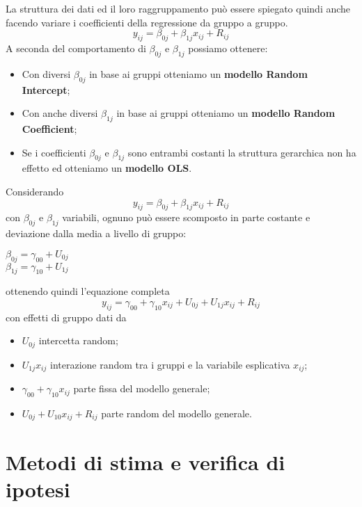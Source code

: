 \documentclass[a4page, 11pt]{article} %
\begin{document}
La struttura dei dati ed il loro raggruppamento può essere spiegato quindi anche facendo variare i coefficienti della regressione da gruppo a gruppo.
\begin{equation*}
y_{ij}=\beta_{0j}+\beta_{1j} x_{ij}+ R_{ij}
\end{equation*}
A seconda del comportamento di $\beta_{0j}$ e $\beta_{1j}$ possiamo ottenere:
\begin{itemize}
\item Con diversi $\beta_{0j}$ in base ai gruppi otteniamo un  \textbf{modello Random Intercept};
\item Con anche diversi $\beta_{1j}$ in base ai gruppi otteniamo un \textbf{modello Random Coefficient};
\item Se i coefficienti $\beta_{0j}$ e $\beta_{1j}$ sono entrambi costanti la struttura gerarchica non ha effetto ed otteniamo un \textbf{modello OLS}.
\end{itemize}
Considerando
\begin{equation*}
y_{ij} = \beta_{0j} + \beta_{1j} x_{ij} +R_{ij}
\end{equation*}
con $\beta_{0j}$ e $\beta_{1j}$ variabili, ognuno può essere scomposto in parte costante e deviazione dalla media a livello di gruppo:
\begin{center}
$\beta_{0j} = \gamma_{00} + U_{0j}$ \\
$\beta_{1j} = \gamma_{10} + U_{1j}$
\end{center}
ottenendo quindi l'equazione completa
\begin{equation*}
y_{ij} = \gamma_{00} + \gamma_{10} x_{ij} + U_{0j} + U_{1j} x_{ij} + R_{ij}
\end{equation*}
con effetti di gruppo dati da
\begin{itemize}
\item $U_{0j}$ intercetta random;
\item $U_{1j} x_{ij}$ interazione random tra i gruppi e la variabile esplicativa $x_{ij}$;
\item $\gamma_{00} + \gamma_{10} x_{ij}$ parte fissa del modello generale;
\item $U_{0j} + U_{10} x_{ij} + R_{ij}$ parte random del modello generale.
\end{itemize}
\section{Metodi di stima e verifica di ipotesi}
\end{document}

